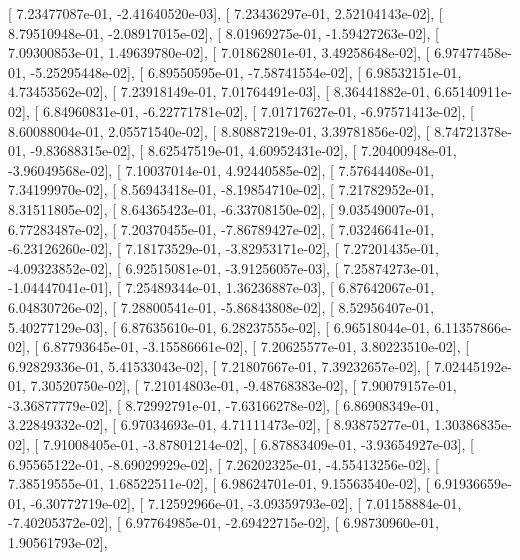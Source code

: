 \documentclass{article}
\begin{document}
       [  7.23477087e-01,  -2.41640520e-03],
       [  7.23436297e-01,   2.52104143e-02],
       [  8.79510948e-01,  -2.08917015e-02],
       [  8.01969275e-01,  -1.59427263e-02],
       [  7.09300853e-01,   1.49639780e-02],
       [  7.01862801e-01,   3.49258648e-02],
       [  6.97477458e-01,  -5.25295448e-02],
       [  6.89550595e-01,  -7.58741554e-02],
       [  6.98532151e-01,   4.73453562e-02],
       [  7.23918149e-01,   7.01764491e-03],
       [  8.36441882e-01,   6.65140911e-02],
       [  6.84960831e-01,  -6.22771781e-02],
       [  7.01717627e-01,  -6.97571413e-02],
       [  8.60088004e-01,   2.05571540e-02],
       [  8.80887219e-01,   3.39781856e-02],
       [  8.74721378e-01,  -9.83688315e-02],
       [  8.62547519e-01,   4.60952431e-02],
       [  7.20400948e-01,  -3.96049568e-02],
       [  7.10037014e-01,   4.92440585e-02],
       [  7.57644408e-01,   7.34199970e-02],
       [  8.56943418e-01,  -8.19854710e-02],
       [  7.21782952e-01,   8.31511805e-02],
       [  8.64365423e-01,  -6.33708150e-02],
       [  9.03549007e-01,   6.77283487e-02],
       [  7.20370455e-01,  -7.86789427e-02],
       [  7.03246641e-01,  -6.23126260e-02],
       [  7.18173529e-01,  -3.82953171e-02],
       [  7.27201435e-01,  -4.09323852e-02],
       [  6.92515081e-01,  -3.91256057e-03],
       [  7.25874273e-01,  -1.04447041e-01],
       [  7.25489344e-01,   1.36236887e-03],
       [  6.87642067e-01,   6.04830726e-02],
       [  7.28800541e-01,  -5.86843808e-02],
       [  8.52956407e-01,   5.40277129e-03],
       [  6.87635610e-01,   6.28237555e-02],
       [  6.96518044e-01,   6.11357866e-02],
       [  6.87793645e-01,  -3.15586661e-02],
       [  7.20625577e-01,   3.80223510e-02],
       [  6.92829336e-01,   5.41533043e-02],
       [  7.21807667e-01,   7.39232657e-02],
       [  7.02445192e-01,   7.30520750e-02],
       [  7.21014803e-01,  -9.48768383e-02],
       [  7.90079157e-01,  -3.36877779e-02],
       [  8.72992791e-01,  -7.63166278e-02],
       [  6.86908349e-01,   3.22849332e-02],
       [  6.97034693e-01,   4.71111473e-02],
       [  8.93875277e-01,   1.30386835e-02],
       [  7.91008405e-01,  -3.87801214e-02],
       [  6.87883409e-01,  -3.93654927e-03],
       [  6.95565122e-01,  -8.69029929e-02],
       [  7.26202325e-01,  -4.55413256e-02],
       [  7.38519555e-01,   1.68522511e-02],
       [  6.98624701e-01,   9.15563540e-02],
       [  6.91936659e-01,  -6.30772719e-02],
       [  7.12592966e-01,  -3.09359793e-02],
       [  7.01158884e-01,  -7.40205372e-02],
       [  6.97764985e-01,  -2.69422715e-02],
       [  6.98730960e-01,   1.90561793e-02],
\end{document}
